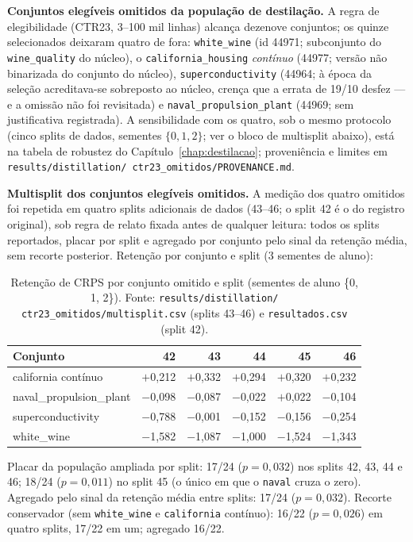 \textbf{Conjuntos elegíveis omitidos da população de destilação.} A
regra de elegibilidade (CTR23, 3--100 mil linhas) alcança dezenove
conjuntos; os quinze selecionados deixaram quatro de fora:
\texttt{white\_wine} (id 44971; subconjunto do \texttt{wine\_quality}
do núcleo), o \texttt{california\_housing} \emph{contínuo} (44977;
versão não binarizada do conjunto do núcleo),
\texttt{superconductivity} (44964; à época da seleção acreditava-se
sobreposto ao núcleo, crença que a errata de 19/10 desfez --- e a
omissão não foi revisitada) e
\texttt{naval\_propulsion\_plant} (44969; sem justificativa
registrada). A sensibilidade com os quatro, sob o mesmo protocolo
(cinco splits de dados, sementes $\{0,1,2\}$; ver o bloco de
multisplit abaixo), está na tabela de robustez do
Capítulo~\ref{chap:destilacao}; proveniência e limites em
\texttt{results/\allowbreak distillation/\allowbreak
ctr23\_\allowbreak omitidos/\allowbreak PROVENANCE.md}.

\textbf{Multisplit dos conjuntos elegíveis omitidos.} A medição dos
quatro omitidos foi repetida em quatro splits adicionais de dados
(43--46; o split 42 é o do registro original), sob regra de relato
fixada antes de qualquer leitura: todos os splits reportados, placar
por split e agregado por conjunto pelo sinal da retenção média, sem
recorte posterior. Retenção por conjunto e split (3 sementes de
aluno):

\begin{table}[htbp]
\centering
\caption[Multisplit dos omitidos da CTR23]{Retenção de CRPS por
conjunto omitido e split (sementes de aluno \{0, 1, 2\}). Fonte:
\texttt{results/\allowbreak distillation/\allowbreak
ctr23\_\allowbreak omitidos/\allowbreak multisplit.csv} (splits
43--46) e \texttt{resultados.csv} (split 42).}
\label{tab:app-multisplit}
\small
\begin{tabular}{lrrrrr}
\toprule
Conjunto & 42 & 43 & 44 & 45 & 46 \\
\midrule
california contínuo & $+$0,212 & $+$0,332 & $+$0,294 & $+$0,320 & $+$0,232 \\
naval\_propulsion\_plant & $-$0,098 & $-$0,087 & $-$0,022 & $+$0,022 & $-$0,104 \\
superconductivity & $-$0,788 & $-$0,001 & $-$0,152 & $-$0,156 & $-$0,254 \\
white\_wine & $-$1,582 & $-$1,087 & $-$1,000 & $-$1,524 & $-$1,343 \\
\bottomrule
\end{tabular}
\end{table}

Placar da população ampliada por split: 17/24 ($p=0{,}032$) nos splits
42, 43, 44 e 46; 18/24 ($p=0{,}011$) no split 45 (o único em que o
\texttt{naval} cruza o zero). Agregado pelo sinal da retenção média
entre splits: 17/24 ($p=0{,}032$). Recorte conservador (sem
\texttt{white\_wine} e \texttt{california} contínuo): 16/22
($p=0{,}026$) em quatro splits, 17/22 em um; agregado 16/22.
